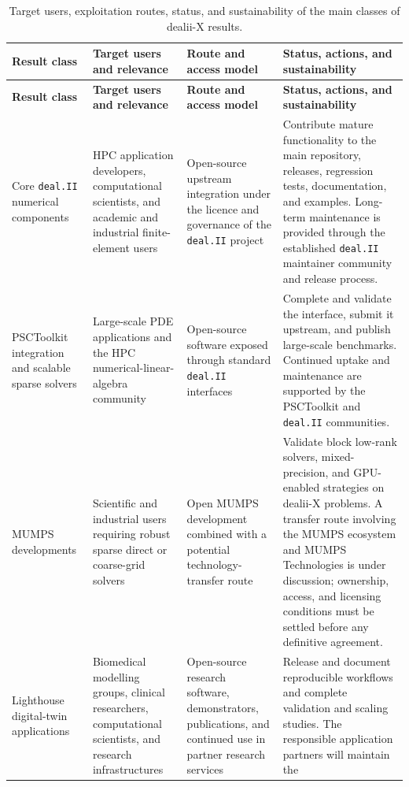 \documentclass[a4paper,12pt]{article}
\begin{document}
\begingroup
\footnotesize
\renewcommand{\arraystretch}{1.15}
\begin{longtable}{|p{2.4cm}|p{2.9cm}|p{3.1cm}|p{4.2cm}|}
\caption{Target users, exploitation routes, status, and sustainability of the
main classes of dealii-X results.}
\label{tab:exploitation_routes}\\
\hline
\textbf{Result class} & \textbf{Target users and relevance} &
\textbf{Route and access model} & \textbf{Status, actions, and sustainability} \\
\hline
\endfirsthead
\hline
\textbf{Result class} & \textbf{Target users and relevance} &
\textbf{Route and access model} & \textbf{Status, actions, and sustainability} \\
\hline
\endhead
Core \texttt{deal.II} numerical components &
HPC application developers, computational scientists, and academic and
industrial finite-element users &
Open-source upstream integration under the licence and governance of the
\texttt{deal.II} project &
Contribute mature functionality to the main repository, releases, regression
tests, documentation, and examples. Long-term maintenance is provided through
the established \texttt{deal.II} maintainer community and release process. \\
\hline
PSCToolkit integration and scalable sparse solvers &
Large-scale PDE applications and the HPC numerical-linear-algebra community &
Open-source software exposed through standard \texttt{deal.II} interfaces &
Complete and validate the interface, submit it upstream, and publish
large-scale benchmarks. Continued uptake and maintenance are supported by the
PSCToolkit and \texttt{deal.II} communities. \\
\hline
MUMPS developments &
Scientific and industrial users requiring robust sparse direct or coarse-grid
solvers &
Open MUMPS development combined with a potential technology-transfer route &
Validate block low-rank solvers, mixed-precision, and GPU-enabled strategies on dealii-X
problems. A transfer route involving the MUMPS ecosystem and MUMPS
Technologies is under discussion; ownership, access, and licensing conditions
must be settled before any definitive agreement. \\
\hline
Lighthouse digital-twin applications &
Biomedical modelling groups, clinical researchers, computational scientists,
and research infrastructures &
Open-source research software, demonstrators, publications, and continued use
in partner research services &
Release and document reproducible workflows and complete validation and
scaling studies. The responsible application partners will maintain the

\end{longtable}
\end{document}
